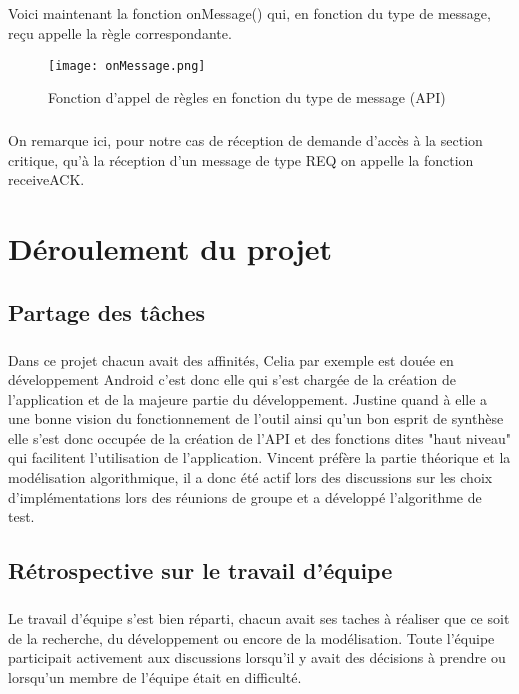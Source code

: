 \documentclass[a4paper,10pt]{report}
\begin{document}
\paragraph{}
Voici maintenant la fonction onMessage() qui, en fonction du type de message, reçu appelle la règle correspondante.

\begin{figure}[h]
    \hspace{-3cm}
    \texttt{[image: onMessage.png]}
    \caption{Fonction d'appel de règles en fonction du type de message (API)}
\end{figure}
\paragraph{}
On remarque ici, pour notre cas de réception de demande d'accès à la section critique, qu'à la réception d'un message de type REQ on appelle la fonction receiveACK.

\chapter{Déroulement du projet}
 \section{Partage des tâches}
 \paragraph{}
 Dans ce projet chacun avait des affinités, Celia par exemple est douée en développement Android c'est donc elle qui s'est chargée de la création de l'application et de la majeure partie du développement. Justine quand à elle a une bonne vision du fonctionnement de l'outil ainsi qu'un bon esprit de synthèse elle s'est donc occupée de la création de l'API et des fonctions dites "haut niveau" qui facilitent l'utilisation de l'application. Vincent préfère la partie théorique et la modélisation algorithmique, il a donc été actif lors des discussions sur les choix d'implémentations lors des réunions de groupe et a développé l'algorithme de test.
 \section{Rétrospective sur le travail d'équipe}
 \paragraph{}
 Le travail d'équipe s'est bien réparti, chacun avait ses taches à réaliser que ce soit de la recherche, du développement ou encore de la modélisation. Toute l'équipe participait activement aux discussions lorsqu'il y avait des décisions à prendre ou lorsqu'un membre de l'équipe était en difficulté.
\end{document}
